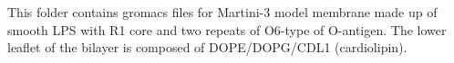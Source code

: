 This folder contains gromacs files for Martini-3 model membrane made up of smooth LPS with R1 core and two repeats of O6-type of O-antigen. The lower leaflet of the bilayer is composed of DOPE/DOPG/CDL1 (cardiolipin).
